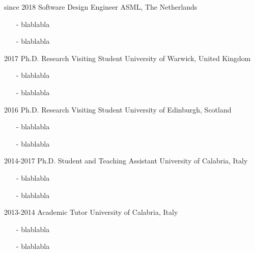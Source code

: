 \documentclass[]{twentysecondscv}
\begin{document}
\begin{twenty}
  \twentyitem
    {since 2018}
    {Software Design Engineer}
    {ASML, The Netherlands}
	{
		\vspace{-10pt}
		\begin{itemize}[leftmargin=*]
			\footnotesize
			\item[-] blablabla
			\item[-] blablabla
		\end{itemize} 
	}
  \twentyitem
    {2017}
    {Ph.D. {\normalfont Research Visiting Student}}
    {University of Warwick, United Kingdom}
	{
		\vspace{-10pt}
		\begin{itemize}[leftmargin=*]
			\footnotesize
			\item[-] blablabla
			\item[-] blablabla
		\end{itemize} 
	}
  \twentyitem
    {2016}
    {Ph.D. {\normalfont Research Visiting Student}}
    {University of Edinburgh, Scotland}
	{
		\vspace{-10pt}
		\begin{itemize}[leftmargin=*]
			\footnotesize
			\item[-] blablabla
			\item[-] blablabla
		\end{itemize} 
	}
  \twentyitem
    {2014-2017}
    {Ph.D. {\normalfont Student and Teaching Assistant}}
    {University of Calabria, Italy}
	{
		\vspace{-10pt}
		\begin{itemize}[leftmargin=*]
			\item[-] blablabla
			\item[-] blablabla
		\end{itemize} 
	}
  \twentyitem
    {2013-2014}
    {Academic Tutor}
    {University of Calabria, Italy}
    {
	    \vspace{-10pt}
	    \begin{itemize}[leftmargin=*]
	    	\footnotesize
	    	\item[-] blablabla
	    	\item[-] blablabla
	    \end{itemize} 
    }
\end{twenty}




\end{document}
